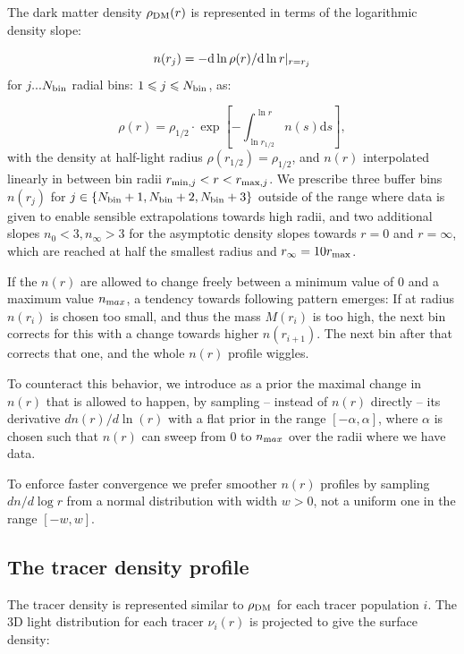 The dark matter density $\rho_{\rm DM}(r)$ is represented in terms of the
logarithmic density slope:

\begin{equation}
n(r_j)=-{\rm d}\ln\rho(r)/{\rm d}\ln
r|_{r=r_j}
\end{equation}
for $j ... N_{\rm bin}$ radial bins: $1\leq j\leq N_{\rm bin}$, as:

\begin{equation*}
    \rho(r) = \rho_{1/2}\cdot\exp\left[-\int_{\ln r_{1/2}}^{\ln r}n(s)\text{d}s\right],
\end{equation*}
with the density at half-light radius $\rho(r_{1/2})=\rho_{1/2}$, and $n(r)$
interpolated linearly in between bin radii $r_{{\rm min},j}<r<r_{{\rm
    max},j}$. We prescribe three buffer bins $n(r_j)$ for $j\in\{N_{\rm bin}+1,
N_{\rm bin}+2, N_{\rm bin}+3\}$ outside of the range where data is given to
enable sensible extrapolations towards high radii, and two additional slopes
$n_0 < 3, n_\infty>3$ for the asymptotic density slopes towards $r=0$ and
$r=\infty$, which are reached at half the smallest radius and $r_\infty=10r_{\rm
  max}$.

If the $n(r)$ are allowed to change freely between a minimum
value of $0$ and a maximum value $n_{\text max}$, a tendency towards following
pattern emerges: If at radius $n(r_i)$ is chosen too small, and thus the mass
$M(r_i)$ is too high, the next bin corrects for this with a change towards
higher $n(r_{i+1})$. The next bin after that corrects that one, and the whole
$n(r)$ profile wiggles.

To counteract this behavior, we introduce as a prior the maximal change in
$n(r)$ that is allowed to happen, by sampling -- instead of $n(r)$ directly --
its derivative $dn(r)/d\ln(r)$ with a flat prior in the range $[-\alpha,
\alpha]$, where $\alpha$ is chosen such that $n(r)$ can sweep from $0$ to
$n_{\text max}$ over the radii where we have data.

To enforce faster convergence we prefer smoother $n(r)$ profiles
by sampling $dn/d\log r$ from a normal distribution with width $w>0$,
not a uniform one in the range $[-w, w]$.

\subsection{The tracer density profile}
The tracer density is represented similar to $\rho_{\rm DM}$ for each tracer
population $i$. The 3D light distribution for each tracer $\nu_i(r)$ is
projected to give the surface density:


